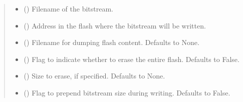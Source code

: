 \documentclass[letterpaper,10pt,english]{sphinxmanual}
\begin{document}
\begin{fulllineitems}
\begin{fulllineitems}
\begin{quote}
\begin{description}
\begin{itemize}
\item {} 
\sphinxAtStartPar
{} () \textendash{} Filename of the bitstream.

\item {} 
\sphinxAtStartPar
{} () \textendash{} Address in the flash where the bitstream will be written.

\item {} 
\sphinxAtStartPar
{} (\sphinxstyleliteralemphasis{\sphinxupquote{, }}) \textendash{} Filename for dumping flash content. Defaults to None.

\item {} 
\sphinxAtStartPar
{} (\sphinxstyleliteralemphasis{\sphinxupquote{, }}) \textendash{} Flag to indicate whether to erase the entire flash. Defaults to False.

\item {} 
\sphinxAtStartPar
{} (\sphinxstyleliteralemphasis{\sphinxupquote{, }}) \textendash{} Size to erase, if specified. Defaults to None.

\item {} 
\sphinxAtStartPar
{} (\sphinxstyleliteralemphasis{\sphinxupquote{, }}) \textendash{} Flag to prepend bitstream size during writing. Defaults to False.

\end{itemize}

\end{description}\end{quote}

\end{fulllineitems}



\end{fulllineitems}
\end{document}
